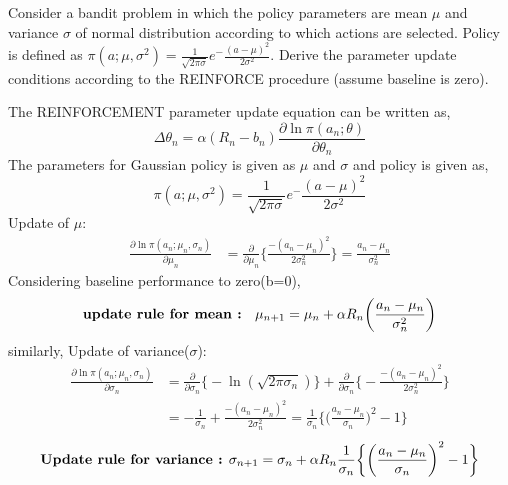 \documentclass[solution,addpoints,12pt]{exam}
\begin{document}
\begin{questions}
\question[3]
Consider a bandit problem in which the policy parameters are mean $ \mu$ and variance $\sigma$ of normal distribution according to which actions are selected. Policy is defined as $ \pi(a;\mu,\sigma^2) = \frac{1}{\sqrt{2\pi\sigma}}e^-\frac{(a-\mu)^2}{2\sigma^2}$. Derive the parameter update conditions according to the REINFORCE procedure (assume baseline is zero).

\begin{solution}
The REINFORCEMENT parameter update equation can be written as,\\
\begin{equation}
	\Delta \theta_n = \alpha (R_n - b_n) \frac{\partial \ln \pi(a_n;\theta)}{\partial \theta_n}
\end{equation}
The parameters for Gaussian policy is given as $\mu$ and $\sigma$ and policy is given as,
\begin{equation}
	\pi(a;\mu,\sigma^2) = \frac{1}{\sqrt{2\pi\sigma}}e^-\frac{(a-\mu)^2}{2\sigma^2}
\end{equation}
Update of $\mu$:
\begin{equation}
\begin{aligned}
\frac{\partial \ln \pi(a_n;\mu_n,\sigma_n)}{\partial \mu_n} &= \frac{\partial}{\partial\mu_n} \bigg\{ \frac{-(a_n -\mu_n)^2}{2\sigma_n^2}\bigg\} 
= \frac{a_n-\mu_n}{\sigma_n^2}
\end{aligned}
\end{equation}
Considering baseline performance to zero(b=0), \\
\begin{equation}
	\text{\textbf{update rule for mean  :   }  }
	\mu_{n+1} = \mu_{n} + \alpha R_n \bigg(\frac{a_n-\mu_n}{\sigma_n^2}\bigg)
\end{equation}
similarly,
Update of variance($\sigma$):
\begin{equation}
\begin{aligned}
\frac{\partial \ln \pi(a_n;\mu_n,\sigma_n)}{\partial \sigma_n} &= \frac{\partial}{\partial\sigma_n} \bigg\{ -\ln (\sqrt{2\pi\sigma_n})\bigg\}+ \frac{\partial}{\partial \sigma_n}\bigg\{- \frac{-(a_n -\mu_n)^2}{2\sigma_n^2} \bigg\}\\
&= - \frac{1}{\sigma_n} +\frac{-(a_n -\mu_n)^2}{2\sigma_n^2}
= \frac{1}{\sigma_n} \bigg\{ \bigg(\frac{a_n -\mu_n}{\sigma_n}\bigg)^2 - 1 \bigg\}
\end{aligned}
\end{equation}
\begin{equation}
\text{\textbf{Update rule for variance  :}      } 
\sigma_{n+1} = \sigma_{n} + \alpha R_n \frac{1}{\sigma_n} \bigg\{ \bigg(\frac{a_n -\mu_n}{\sigma_n}\bigg)^2 - 1 \bigg\}
\end{equation}



\end{solution}
\end{questions}
\end{document}
